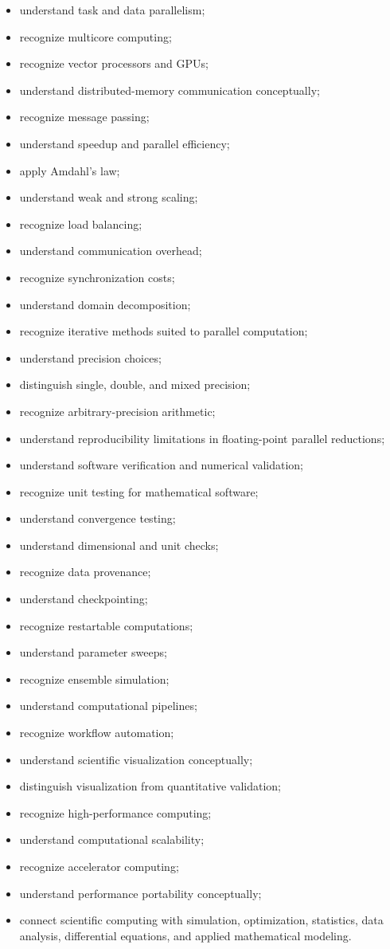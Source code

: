 {\begin{itemize}
    \item understand task and data parallelism;
    \item recognize multicore computing;
    \item recognize vector processors and GPUs;
    \item understand distributed-memory communication conceptually;
    \item recognize message passing;
    \item understand speedup and parallel efficiency;
    \item apply Amdahl's law;
    \item understand weak and strong scaling;
    \item recognize load balancing;
    \item understand communication overhead;
    \item recognize synchronization costs;
    \item understand domain decomposition;
    \item recognize iterative methods suited to parallel computation;
    \item understand precision choices;
    \item distinguish single, double, and mixed precision;
    \item recognize arbitrary-precision arithmetic;
    \item understand reproducibility limitations in floating-point parallel
          reductions;
    \item understand software verification and numerical validation;
    \item recognize unit testing for mathematical software;
    \item understand convergence testing;
    \item understand dimensional and unit checks;
    \item recognize data provenance;
    \item understand checkpointing;
    \item recognize restartable computations;
    \item understand parameter sweeps;
    \item recognize ensemble simulation;
    \item understand computational pipelines;
    \item recognize workflow automation;
    \item understand scientific visualization conceptually;
    \item distinguish visualization from quantitative validation;
    \item recognize high-performance computing;
    \item understand computational scalability;
    \item recognize accelerator computing;
    \item understand performance portability conceptually;
    \item connect scientific computing with simulation, optimization,
          statistics, data analysis, differential equations, and applied
          mathematical modeling.
\end{itemize}
}

